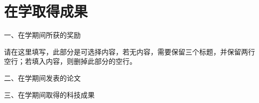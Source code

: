 {\centering\chapter*{在学取得成果}}

\noindent 一、在学期间所获的奖励

请在这里填写，此部分是可选择内容，若无内容，需要保留三个标题，并保留两行空行；若填入内容，则删掉此部分的空行。
\vspace{2\baselineskip}

\noindent 二、在学期间发表的论文 

\vspace{2\baselineskip}

\noindent 三、在学期间取得的科技成果
